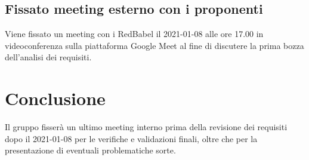 \subsection{Fissato meeting esterno con i proponenti}
Viene fissato un meeting con i RedBabel il 2021-01-08 alle ore 17.00 in videoconferenza sulla piattaforma Google Meet
al fine di discutere la prima bozza dell'analisi dei requisiti.

\section{Conclusione}
Il gruppo fisserà un ultimo meeting interno prima della revisione dei requisiti dopo il 2021-01-08 per
le verifiche e validazioni finali, oltre che per la presentazione di eventuali problematiche sorte.


